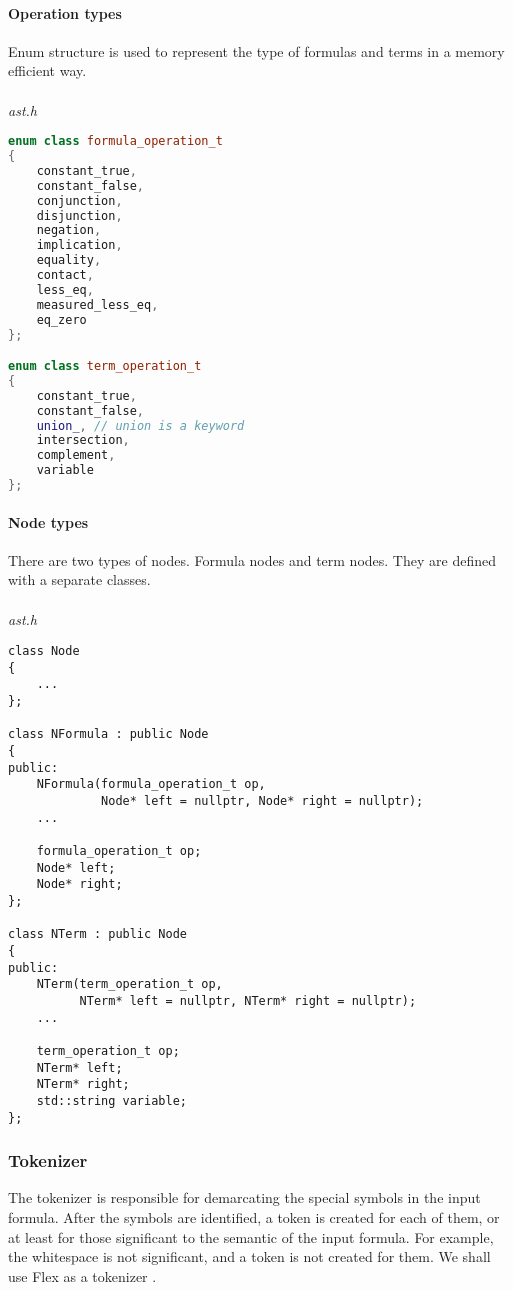 \documentclass{article}
\begin{document}
	\paragraph{Operation types} Enum structure is used to represent the type of formulas and terms in a memory efficient way.
	\\
	\\
\noindent
\textit{ast.h}
	\begin{lstlisting}[language=C++]
enum class formula_operation_t
{
    constant_true,
    constant_false,
    conjunction,
    disjunction,
    negation,
    implication,
    equality,
    contact,
    less_eq,
    measured_less_eq,
    eq_zero
};

enum class term_operation_t
{
    constant_true,
    constant_false,
    union_, // union is a keyword
    intersection,
    complement,
    variable
};
	\end{lstlisting}

	\newpage
	\paragraph{Node types} There are two types of nodes. Formula nodes and term nodes. They are defined with a separate classes.
	\\
	\\
\noindent
\textit{ast.h}
	\begin{lstlisting}
class Node
{
    ...
};

class NFormula : public Node
{
public:
    NFormula(formula_operation_t op,
             Node* left = nullptr, Node* right = nullptr);
    ...

    formula_operation_t op;
    Node* left;
    Node* right;
};

class NTerm : public Node
{
public:
    NTerm(term_operation_t op,
          NTerm* left = nullptr, NTerm* right = nullptr);
    ...

    term_operation_t op;
    NTerm* left;
    NTerm* right;
    std::string variable;
};
	\end{lstlisting}

	\subsubsection{Tokenizer}
	The tokenizer is responsible for demarcating the special symbols in the input formula.
	After the symbols are identified, a token is created for each of them, or at least for those significant to the semantic of the input formula.
	For example, the whitespace is not significant, and a token is not created for them.
	We shall use Flex as a tokenizer \cite{flex-tokenizer}.
\end{document}
